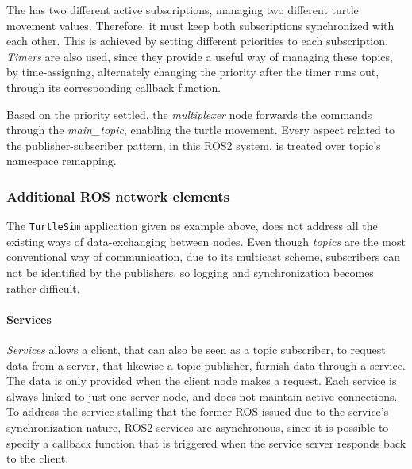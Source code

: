 The  has two different active subscriptions, managing two different turtle movement values. Therefore, it must keep both subscriptions synchronized with each other. This is achieved by setting different priorities to each subscription. %
\textit{Timers} are also used, since they provide a useful way of managing these topics, by time-assigning, alternately changing the priority after the timer runs out, through its corresponding callback function.

Based on the priority settled, the \textit{multiplexer} node forwards the commands through the \textit{main\_topic}, enabling the turtle movement. Every aspect related to the publisher-subscriber pattern, in this ROS2 system, is treated over topic's namespace remapping.


\subsubsection{Additional ROS network elements}

The \texttt{TurtleSim} application given as example above, %
does not address all the existing ways of data-exchanging between nodes. Even though \textit{topics} are the most conventional way of communication, due to its multicast scheme, subscribers can not be identified by the publishers, so logging and synchronization becomes rather difficult.


\paragraph{Services}

\textit{Services} allows a client, that can also be seen as a topic subscriber, to request data from a server, that likewise a topic publisher, furnish data through a service. The data is only provided when the client node makes a request. Each service is always linked to just one server node, and does not maintain active connections. To address the service stalling that the former ROS issued due to the service's synchronization nature, ROS2 services are asynchronous, since it is possible to specify a callback function that is triggered when the service server responds back to the client.
         

